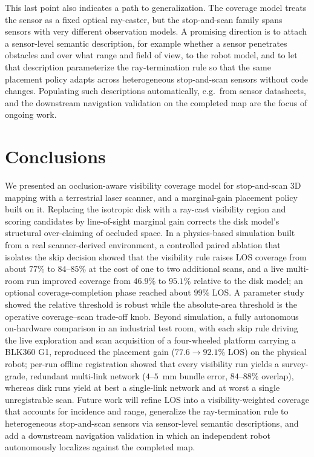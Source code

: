 \documentclass[sensors,article,submit,pdftex,moreauthors]{Definitions/mdpi}
\begin{document}
This last point also indicates a path to generalization. The coverage model
treats the sensor as a fixed optical ray-caster, but the stop-and-scan family
spans sensors with very different observation models. A promising direction is to
attach a sensor-level semantic description, for example whether a sensor
penetrates obstacles and over what range and field of view, to the robot model,
and to let that description parameterize the ray-termination rule so that the same
placement policy adapts across heterogeneous stop-and-scan sensors without code
changes. Populating such descriptions automatically, e.g.\ from sensor
datasheets, and the downstream navigation validation on the completed map are
the focus of ongoing work.

\section{Conclusions}
\label{sec:conclusions}

We presented an occlusion-aware visibility coverage model for stop-and-scan 3D
mapping with a terrestrial laser scanner, and a marginal-gain placement policy
built on it. Replacing the isotropic disk with a ray-cast visibility region and
scoring candidates by line-of-sight marginal gain corrects the disk model's
structural over-claiming of occluded space. In a physics-based simulation built
from a real scanner-derived environment, a controlled paired ablation that
isolates the skip decision showed that the visibility rule raises LOS coverage
from about $77\%$ to $84$--$85\%$ at the cost of one to two additional scans, and
a live multi-room run improved coverage from $46.9\%$ to $95.1\%$ relative to the
disk model; an optional coverage-completion phase reached about $99\%$ LOS. A
parameter study showed the relative threshold is robust while the absolute-area
threshold is the operative coverage--scan trade-off knob. Beyond simulation, a fully
autonomous on-hardware comparison in an industrial test room, with each skip
rule driving the live exploration and scan acquisition of a four-wheeled
platform carrying a BLK360 G1, reproduced the placement gain
($77.6\to92.1\%$ LOS) on the physical robot; per-run offline registration showed
that every visibility run yields a survey-grade, redundant multi-link network
($4$--$5$~mm bundle error, $84$--$88\%$ overlap), whereas disk runs yield at
best a single-link network and at worst a single unregistrable scan. Future work will
refine LOS into a visibility-weighted coverage that accounts for incidence and
range, generalize the ray-termination rule to heterogeneous stop-and-scan sensors
via sensor-level semantic descriptions, and add a downstream navigation validation
in which an independent robot autonomously localizes against the completed map.
\end{document}
